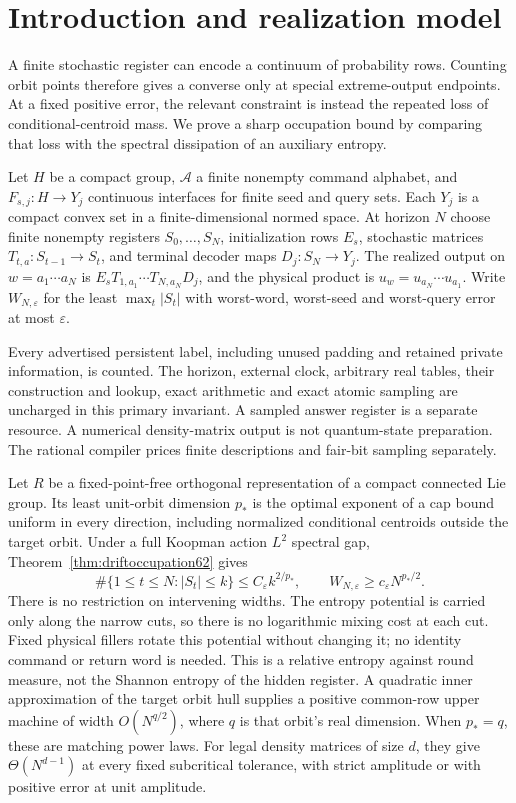 \section{Introduction and realization model}
A finite stochastic register can encode a continuum of probability
rows. Counting orbit points therefore gives a converse only at special
extreme-output endpoints. At a fixed positive error, the relevant
constraint is instead the repeated loss of conditional-centroid mass.
We prove a sharp occupation bound by comparing that loss with the
spectral dissipation of an auxiliary entropy.

\begin{definition}\label{def:machine54}
Let $H$ be a compact group, $\mathcal A$ a finite nonempty command
alphabet, and $F_{s,j}:H\to Y_j$ continuous interfaces for finite seed
and query sets. Each $Y_j$ is a compact convex set in a finite-dimensional
normed space. At horizon $N$ choose finite nonempty registers
$S_0,\ldots,S_N$, initialization rows $E_s$, stochastic matrices
$T_{t,a}:S_{t-1}\to S_t$, and terminal decoder maps $D_j:S_N\to Y_j$.
The realized output on $w=a_1\cdots a_N$ is
$E_sT_{1,a_1}\cdots T_{N,a_N}D_j$, and the physical product is
$u_w=u_{a_N}\cdots u_{a_1}$. Write $W_{N,\varepsilon}$ for the least
$\max_t|S_t|$ with worst-word, worst-seed and worst-query error at most
$\varepsilon$.
\end{definition}
Every advertised persistent label, including unused padding and retained
private information, is counted. The horizon, external clock, arbitrary
real tables, their construction and lookup, exact arithmetic and exact
atomic sampling are uncharged in this primary invariant. A sampled
answer register is a separate resource. A numerical density-matrix
output is not quantum-state preparation. The rational compiler prices
finite descriptions and fair-bit sampling separately.

Let $R$ be a fixed-point-free orthogonal representation of a compact
connected Lie group. Its least unit-orbit dimension $p_*$ is the optimal
exponent of a cap bound uniform in every direction, including normalized
conditional centroids outside the target orbit. Under a full Koopman action $L^2$ spectral
gap, Theorem~\ref{thm:driftoccupation62}
gives
\[
 \#\{1\le t\le N:|S_t|\le k\}\le C_\varepsilon k^{2/p_*},
 \qquad W_{N,\varepsilon}\ge c_\varepsilon N^{p_*/2}.
\]
There is no restriction on intervening widths. The entropy potential
is carried only along the narrow cuts, so there is no logarithmic
mixing cost at each cut. Fixed physical fillers rotate this potential
without changing it; no identity command or return word is needed.
This is a relative entropy against round measure, not the Shannon
entropy of the hidden register. A quadratic inner approximation of the target
orbit hull supplies a positive common-row upper machine of width
$O(N^{q/2})$, where $q$ is that orbit's real dimension. When $p_*=q$,
these are matching power laws. For legal density matrices of size $d$,
they give $\Theta(N^{d-1})$ at every fixed subcritical tolerance, with
strict amplitude or with positive error at unit amplitude.

